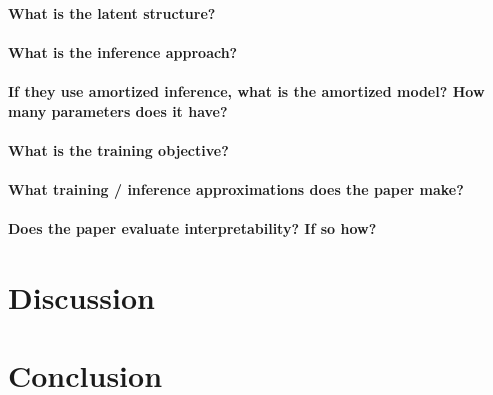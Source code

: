 \documentclass[11pt]{article}
\begin{document}
\paragraph{What is the latent structure?}

\paragraph{What is the inference approach?}

\paragraph{If they use amortized inference, what is the amortized model? How many parameters does it have?}

\paragraph{What is the training objective?}

\paragraph{What training / inference approximations does the paper make?}

\paragraph{Does the paper evaluate interpretability? If so how?}

\section{Discussion}

\section{Conclusion}



\end{document}
